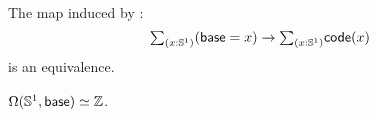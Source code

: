 \documentclass[hott-all.tex]{subfiles}
\begin{document}
% 
\begin{cor}
  The map induced by \encode:
  \[ \tsm{x:\Sn^1} (\base=x) \to \tsm{x:\Sn^1}\code(x) \]
  is an equivalence.
\end{cor}
% 
\begin{thm}
  $\Omega(\mathbb{S}^1,\mathsf{base}) \simeq \mathbb{Z}$.
\end{thm}
% 
% 
% 
\end{document}
